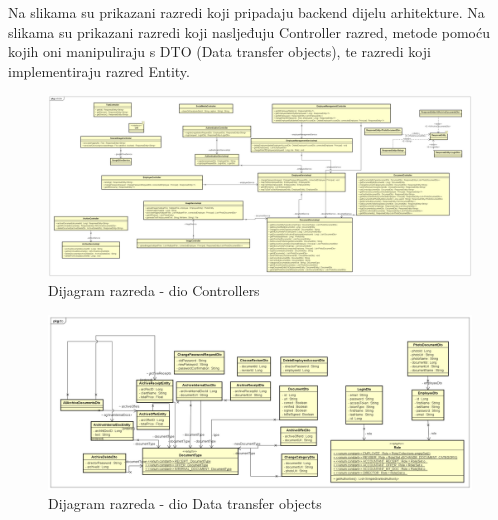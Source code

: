 		Na slikama su prikazani razredi koji pripadaju backend dijelu arhitekture. Na slikama su prikazani razredi koji nasljeđuju Controller razred, metode pomoću kojih oni manipuliraju s DTO (Data transfer objects), te razredi koji implementiraju razred Entity.
		
			\begin{figure}[H]
				\includegraphics[scale=0.5]{slike/dijagram_razreda_controller.png} %
				\centering
				\caption{Dijagram razreda - dio Controllers}
				\label{fig:promjene}
			\end{figure}
			
			\begin{figure}[H]
				\includegraphics[scale=0.5]{slike/dijagram_razreda_dto.png} %
				\centering
				\caption{Dijagram razreda - dio Data transfer objects}
				\label{fig:promjene}
			\end{figure}

